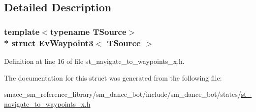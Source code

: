 \subsection{Detailed Description}
\subsubsection*{template$<$typename T\+Source$>$\\*
struct Ev\+Waypoint3$<$ T\+Source $>$}



Definition at line 16 of file st\+\_\+navigate\+\_\+to\+\_\+waypoints\+\_\+x.\+h.



The documentation for this struct was generated from the following file\+:\begin{DoxyCompactItemize}
\item 
smacc\+\_\+sm\+\_\+reference\+\_\+library/sm\+\_\+dance\+\_\+bot/include/sm\+\_\+dance\+\_\+bot/states/\hyperlink{st__navigate__to__waypoints__x_8h}{st\+\_\+navigate\+\_\+to\+\_\+waypoints\+\_\+x.\+h}\end{DoxyCompactItemize}
